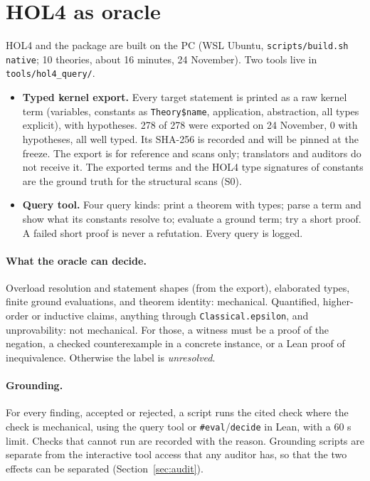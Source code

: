\documentclass[11pt,a4paper]{article}
\newcommand{\code}[1]{\texttt{#1}}
\begin{document}
\section{HOL4 as oracle}\label{sec:hol4}
HOL4 and the package are built on the PC (WSL Ubuntu, \code{scripts/build.sh native}; 10 theories, about 16 minutes, 24 November). Two tools live in \code{tools/hol4\_query/}.
\begin{itemize}
\item \textbf{Typed kernel export.} Every target statement is printed as a raw kernel term (variables, constants as \code{Theory\$name}, application, abstraction, all types explicit), with hypotheses. 278 of 278 were exported on 24 November, 0 with hypotheses, all well typed. Its SHA-256 is recorded and will be pinned at the freeze. The export is for reference and scans only; translators and auditors do not receive it. The exported terms and the HOL4 type signatures of constants are the ground truth for the structural scans (S0).
\item \textbf{Query tool.} Four query kinds: print a theorem with types; parse a term and show what its constants resolve to; evaluate a ground term; try a short proof. A failed short proof is never a refutation. Every query is logged.
\end{itemize}
\paragraph{What the oracle can decide.} Overload resolution and statement shapes (from the export), elaborated types, finite ground evaluations, and theorem identity: mechanical. Quantified, higher-order or inductive claims, anything through \code{Classical.epsilon}, and unprovability: not mechanical. For those, a witness must be a proof of the negation, a checked counterexample in a concrete instance, or a Lean proof of inequivalence. Otherwise the label is \emph{unresolved}.
\paragraph{Grounding.} For every finding, accepted or rejected, a script runs the cited check where the check is mechanical, using the query tool or \code{\#eval}/\code{decide} in Lean, with a 60 s limit. Checks that cannot run are recorded with the reason. Grounding scripts are separate from the interactive tool access that any auditor has, so that the two effects can be separated (Section~\ref{sec:audit}).
\end{document}
